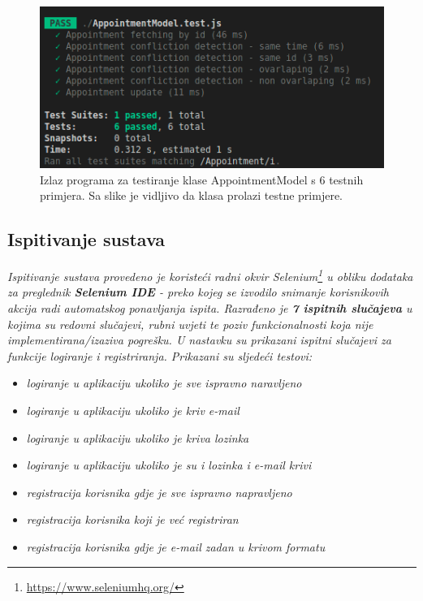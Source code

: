                 \begin{figure}[H]
                    \includegraphics[width=\textwidth]{slike/appointment_tests_out.png} %
                    \caption{Izlaz programa za testiranje klase AppointmentModel s 6 testnih primjera. Sa slike je vidljivo da klasa prolazi testne primjere.}
                    \label{fig:struktura} %
                \end{figure}
			
			
			\subsection{Ispitivanje sustava}
			
			 \textit{Ispitivanje sustava provedeno je koristeći radni okvir Selenium\footnote{\url{https://www.seleniumhq.org/}} u obliku dodataka za preglednik \textbf{Selenium IDE} - preko kojeg se izvodilo snimanje korisnikovih akcija radi automatskog ponavljanja ispita. Razrađeno je \textbf{7 ispitnih slučajeva} u kojima su redovni slučajevi, rubni uvjeti te poziv funkcionalnosti koja nije implementirana/izaziva pogrešku. U nastavku su prikazani ispitni slučajevi za funkcije logiranje i registriranja. Prikazani su sljedeći testovi:}
    	\begin{itemize}
		\item 	\textit{logiranje u aplikaciju ukoliko je sve ispravno naravljeno}
		\item 	\textit{logiranje u aplikaciju ukoliko je kriv e-mail}
		\item 	\textit{logiranje u aplikaciju ukoliko je kriva lozinka}
		\item 	\textit{logiranje u aplikaciju ukoliko je su i lozinka i e-mail krivi}
		\item 	\textit{registracija korisnika gdje je sve ispravno napravljeno}
		\item 	\textit{registracija korisnika koji je već registriran}
		\item 	\textit{registracija korisnika gdje je e-mail zadan u krivom formatu}
	\end{itemize}

